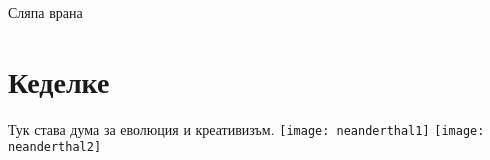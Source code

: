\documentclass{article}
\begin{document}
{\huge Сляпа врана}
\section{Кеделке}
Тук става дума за еволюция и креативизъм.
\texttt{[image: neanderthal1]}
\texttt{[image: neanderthal2]}
\end{document}

